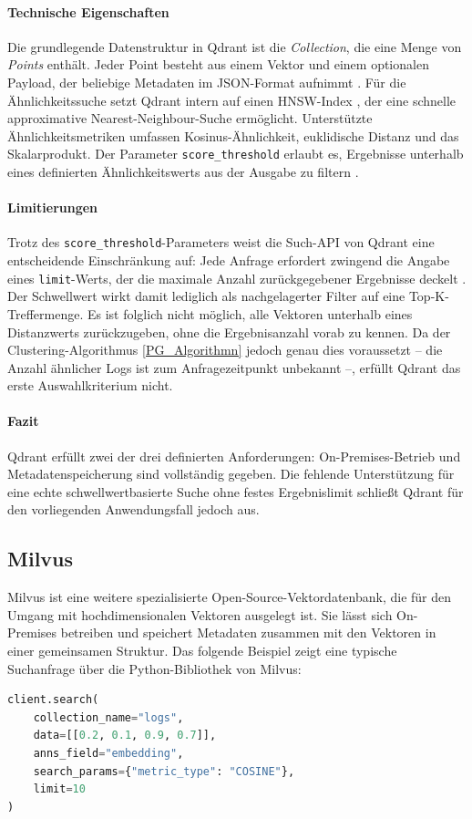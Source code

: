 \paragraph{Technische Eigenschaften}
Die grundlegende Datenstruktur in Qdrant ist die \textit{Collection}, die eine 
Menge von \textit{Points} enthält. Jeder Point besteht aus einem Vektor und einem 
optionalen Payload, der beliebige Metadaten im JSON-Format aufnimmt 
\cite{qdrantPayloadQdrant}. Für die Ähnlichkeitssuche setzt Qdrant intern auf
einen \ac{HNSW}-Index \cite{qdrantQdrantVector}, der eine schnelle approximative
Nearest-Neighbour-Suche ermöglicht. Unterstützte Ähnlichkeitsmetriken umfassen 
Kosinus-Ähnlichkeit, euklidische Distanz und das Skalarprodukt. Der Parameter 
\texttt{score\_threshold} erlaubt es, Ergebnisse unterhalb eines definierten 
Ähnlichkeitswerts aus der Ausgabe zu filtern \cite{qdrantSearchQdrant}.

\paragraph{Limitierungen}
Trotz des \texttt{score\_threshold}-Parameters weist die Such-\ac{API} von Qdrant eine 
entscheidende Einschränkung auf: Jede Anfrage erfordert zwingend die Angabe eines 
\texttt{limit}-Werts, der die maximale Anzahl zurückgegebener Ergebnisse 
deckelt \cite{qdrantSearchQdrant}. Der Schwellwert wirkt damit lediglich als 
nachgelagerter Filter auf eine Top-K-Treffermenge. Es ist folglich nicht möglich, 
alle Vektoren unterhalb eines Distanzwerts zurückzugeben, ohne die Ergebnisanzahl 
vorab zu kennen. Da der Clustering-Algorithmus \ref{PG_Algorithmn} jedoch genau 
dies voraussetzt – die Anzahl ähnlicher Logs ist zum Anfragezeitpunkt unbekannt –, 
erfüllt Qdrant das erste Auswahlkriterium nicht.

\paragraph{Fazit}
Qdrant erfüllt zwei der drei definierten Anforderungen: On-Premises-Betrieb und 
Metadatenspeicherung sind vollständig gegeben. Die fehlende Unterstützung für eine 
echte schwellwertbasierte Suche ohne festes Ergebnislimit schließt Qdrant für den 
vorliegenden Anwendungsfall jedoch aus.

\subsection{Milvus}

Milvus \cite{milvusdocs} ist eine weitere spezialisierte Open-Source-Vektordatenbank, 
die für den Umgang mit hochdimensionalen Vektoren ausgelegt ist. Sie lässt sich 
On-Premises betreiben und speichert Metadaten zusammen mit den Vektoren in einer 
gemeinsamen Struktur. Das folgende Beispiel zeigt eine typische Suchanfrage über 
die Python-Bibliothek von Milvus:
\begin{lstlisting}[language=Python]
client.search(
    collection_name="logs",
    data=[[0.2, 0.1, 0.9, 0.7]],
    anns_field="embedding",
    search_params={"metric_type": "COSINE"},
    limit=10
)
\end{lstlisting}

